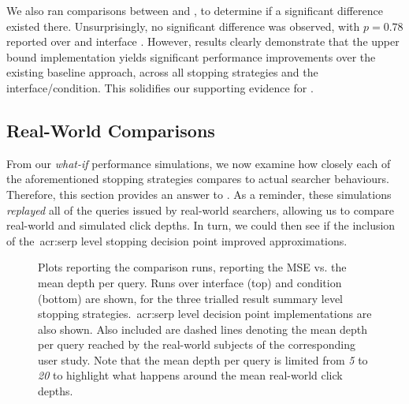 We also ran comparisons between  and , to determine if a significant difference existed there. Unsurprisingly, no significant difference was observed, with $p=0.78$ reported over  and interface . However, results clearly demonstrate that the upper bound  implementation yields significant performance improvements over the existing baseline approach, across all stopping strategies and the interface/condition. This solidifies our supporting evidence for .

\subsection{Real-World Comparisons}\label{sec:serp:results:comparisons}
From our \emph{what-if} performance simulations, we now examine how closely each of the aforementioned stopping strategies compares to actual searcher behaviours. Therefore, this section provides an answer to . As a reminder, these simulations \emph{replayed} all of the queries issued by real-world searchers, allowing us to compare real-world and simulated click depths. In turn, we could then see if the inclusion of the~\gls{acr:serp} level stopping decision point improved approximations.

\begin{figure}[t!]
    \centering
    \caption[Real-world comparisons over the~\gls{acr:serp} decision point]{Plots reporting the comparison runs, reporting the MSE vs. the mean depth per query. Runs over interface  (top) and condition  (bottom) are shown, for the three trialled result summary level stopping strategies.~\gls{acr:serp} level decision point implementations are also shown. Also included are dashed lines denoting the mean depth per query reached by the real-world subjects of the corresponding user study. Note that the mean depth per query is limited from \emph{5} to \emph{20} to highlight what happens around the mean real-world click depths.}
    \label{fig:ch9_comparison_plots}
\end{figure}

